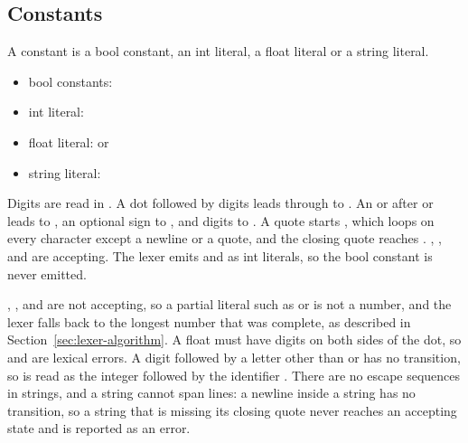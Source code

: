 \subsection{Constants}

A constant is a bool constant, an int literal, a float literal or a string
literal.

\begin{itemize}
    \item bool constants:  
    \item int literal: \code{[0-9]+}
    \item float literal:  or
    \item string literal: 
\end{itemize}

Digits are read in . A dot followed by digits leads through
 to . An  or  after  or
 leads to , an optional sign to , and
digits to . A quote starts , which loops on
every character except a newline or a quote, and the closing quote reaches
. , ,  and
 are accepting. The lexer emits  and  as int
literals, so the bool constant is never emitted.

, , and  are not accepting, so a
partial literal such as  or  is not a number, and the lexer
falls back to the longest number that was complete, as described in
Section~\ref{sec:lexer-algorithm}. A float must have digits on both sides of
the dot, so  and  are lexical errors. A digit followed by a
letter other than  or  has no transition, so  is
read as the integer  followed by the identifier . There
are no escape sequences in strings, and a string cannot span lines: a newline
inside a string has no transition, so a string that is missing its closing
quote never reaches an accepting state and is reported as an error.

